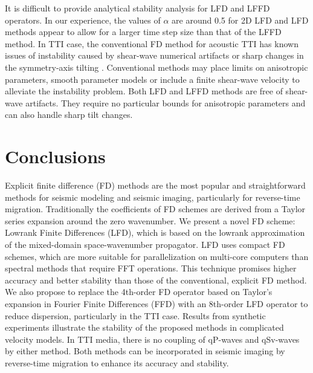 It is difficult to provide analytical stability analysis for LFD and LFFD operators. 
In our experience, the values of $\alpha$ are around 0.5 for 2D LFD and LFD methods appear to allow for a larger time step size than that of the LFFD method.
In TTI case, the conventional FD method for acoustic TTI has known issues of instability caused by shear-wave numerical artifacts or sharp changes in the symmetry-axis tilting \cite[]{grechkat,zhang2,duveneckt}.
Conventional methods may place limits on anisotropic parameters, smooth parameter models or include a finite shear-wave velocity to alleviate the instability problem\cite[]{yoon,zhang3,fletcher}.
Both LFD and LFFD methods are free of shear-wave artifacts. 
They require no particular bounds for anisotropic parameters and can also handle sharp tilt changes.
 
\section{Conclusions}

Explicit finite difference (FD) methods are the most popular and straightforward methods for seismic modeling and seismic imaging,
particularly for reverse-time migration.
Traditionally the coefficients of FD schemes are derived from a Taylor series expansion around the zero wavenumber.
We present a novel FD scheme: Lowrank Finite Differences (LFD), 
which is based on the lowrank approximation of the mixed-domain space-wavenumber propagator.
LFD uses compact FD schemes, which are more suitable for parallelization on multi-core computers than spectral methods that require FFT operations.
This technique promises higher accuracy and better stability than those of the conventional, explicit FD method. 
We also propose to replace the 4th-order FD operator based on Taylor's expansion in Fourier Finite Differences (FFD) 
with an 8th-order LFD operator to reduce dispersion, particularly in the TTI case.
Results from synthetic experiments illustrate the stability of the proposed methods in complicated velocity models. 
In TTI media, there is no coupling of qP-waves and qSv-waves by either method.
Both methods can be incorporated in seismic imaging by reverse-time migration to enhance its accuracy and stability.









